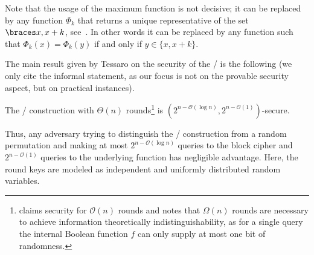 {
    \label{bison:fig:WSN}
}

Note that the usage of the maximum function is not decisive; it can be replaced by any function $\Phi_k$ that returns a unique representative of the set $\set{x, x+k}$, see~.
In other words it can be replaced by any function such that $\Phi_k(x) = \Phi_k(y)$ if and only if  $y \in \{x,x+k\}$.

The main result given by Tessaro on the security of the \WSN/ is the following (we only cite the informal statement, as our focus is not on the provable security aspect, but on practical instances).
\begin{proposition}
    The \WSN/ construction with $\Theta(n)$ rounds\footnote{%
        \citeauthor{AC:Tessaro15} claims security for $\mathcal{O}(n)$ rounds and notes that $\Omega(n)$ rounds are necessary to achieve information theoretically indistinguishability, as for a single query the internal Boolean function $f$ can only supply at most one bit of randomness.
    } is $(2^{n-\mathcal{O}(\log n)}, 2^{n-\mathcal{O}(1)} )$-secure.
\end{proposition}
Thus, any adversary trying to distinguish the \WSN/ construction from a random permutation and making at most $2^{n-\mathcal{O}(\log n)}$ queries to the block cipher and $2^{n-\mathcal{O}(1)}$ queries to the underlying function has negligible advantage.
Here, the round keys are modeled as independent and uniformly distributed random variables.


